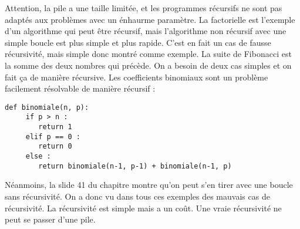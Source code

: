 \documentclass[10pt]{article}
\begin{document}
Attention, la pile a une taille limitée, et les programmes récursifs ne sont pas adaptés aux problèmes avec un énhaurme paramètre.  
\newline \newline 
La factorielle est l'exemple d'un algorithme qui peut être récursif, mais l'algorithme non récursif avec une simple boucle est plus simple et plus rapide. C'est en fait un cas de fausse récursivité, mais simple donc montré comme exemple.  
\newpage
La suite de Fibonacci est la somme des deux nombres qui précède. On a besoin de deux cas simples et on fait ça de manière récursive. Les coefficients binomiaux sont un problème facilement résolvable de manière récursif : 
\lstset{language=Python}
\lstset{basicstyle=\footnotesize}
\begin{lstlisting}
def binomiale(n, p):
	 if p > n : 
		return 1 
	 elif p == 0 : 
		return 0 
	 else : 
		return binomiale(n-1, p-1) + binomiale(n-1, p) 
\end{lstlisting}
Néanmoins, la slide 41 du chapitre montre qu'on peut s'en tirer avec une boucle sans récursivité. On a donc vu dans tous ces exemples des mauvais cas de récursivité. La récursivité est simple mais a un coût. Une vraie récursivité ne peut se passer d'une pile. 
\end{document}

